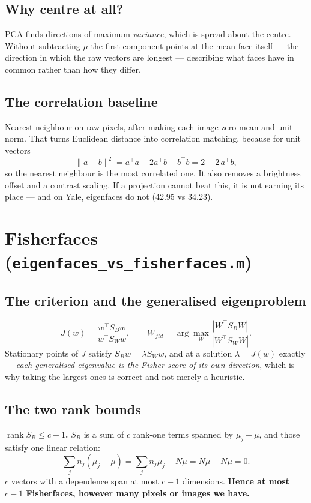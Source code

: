 \documentclass[11pt]{article}
\newcommand{\T}{^{\top}}
\begin{document}
\subsection{Why centre at all?}
PCA finds directions of maximum \emph{variance}, which is spread about the
centre. Without subtracting $\mu$ the first component points at the mean face
itself --- the direction in which the raw vectors are longest --- describing
what faces have in common rather than how they differ.

\subsection{The correlation baseline}
Nearest neighbour on raw pixels, after making each image zero-mean and
unit-norm. That turns Euclidean distance into correlation matching, because for
unit vectors
\[ \|a-b\|^2 = a\T a - 2a\T b + b\T b = 2 - 2\,a\T b, \]
so the nearest neighbour is the most correlated one. It also removes a
brightness offset and a contrast scaling. If a projection cannot beat this, it
is not earning its place --- and on Yale, eigenfaces do not (42.95 vs 34.23).

\section{Fisherfaces (\texttt{eigenfaces\_vs\_fisherfaces.m})}

\subsection{The criterion and the generalised eigenproblem}
\[ J(w)=\frac{w\T S_Bw}{w\T S_Ww},\qquad
   W_{fld}=\arg\max_W\frac{|W\T S_BW|}{|W\T S_WW|}. \]
Stationary points of $J$ satisfy $S_Bw=\lambda S_Ww$, and at a solution
$\lambda=J(w)$ exactly --- \emph{each generalised eigenvalue is the Fisher score
of its own direction}, which is why taking the largest ones is correct and not
merely a heuristic.

\subsection{The two rank bounds}

\textbf{$\operatorname{rank}S_B\le c-1$.} $S_B$ is a sum of $c$ rank-one terms
spanned by $\mu_j-\mu$, and those satisfy one linear relation:
\[ \sum_j n_j(\mu_j-\mu)=\sum_j n_j\mu_j-N\mu=N\mu-N\mu=0. \]
$c$ vectors with a dependence span at most $c-1$ dimensions. \textbf{Hence at
most $c-1$ Fisherfaces, however many pixels or images we have.}
\end{document}

